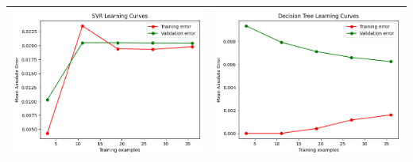 \begin{table}[H]
    \centering
    \footnotesize
    \setlength\tabcolsep{0pt}
    \begin{tabularx}{\textwidth}{|X|X|}
        \hline
        \includegraphics[width=\linewidth, trim=0 0 0 0]{images/SVR_lc50_ridottoAzure.png} &
        \includegraphics[width=\linewidth, trim=0 0 0 0]{images/DecisionTree_lc50_ridottoAzure.png} \\
        \hline

\end{tabularx}
\end{table}

